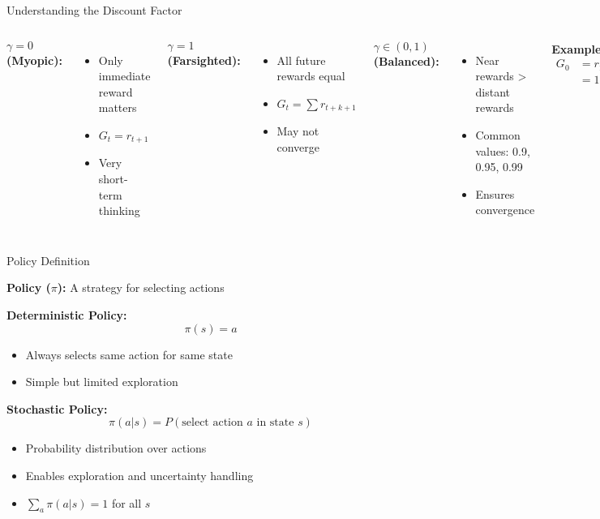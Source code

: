 \documentclass[aspectratio=169,10pt]{beamer}
\begin{document}
\begin{frame}{Understanding the Discount Factor}

\begin{columns}[t]
\textbf{$\gamma = 0$ (Myopic):}
\begin{itemize}
    \item Only immediate reward matters
    \item $G_t = r_{t+1}$
    \item Very short-term thinking
\end{itemize}

\vfill

\textbf{$\gamma = 1$ (Farsighted):}
\begin{itemize}
    \item All future rewards equal
    \item $G_t = \sum r_{t+k+1}$
    \item May not converge
\end{itemize}

\textbf{$\gamma \in (0,1)$ (Balanced):}
\begin{itemize}
    \item Near rewards > distant rewards
    \item Common values: 0.9, 0.95, 0.99
    \item Ensures convergence
\end{itemize}

\vfill

\textbf{Example ($\gamma = 0.9$):}
\begin{align}
G_0 &= r_1 + 0.9 r_2 + 0.81 r_3 + \ldots\\
&= 1 + 0.9 + 0.81 + 0.729 + \ldots
\end{align}
\end{columns}

\end{frame}

\begin{frame}{Policy Definition}

\textbf{Policy ($\pi$):} A strategy for selecting actions

\vfill

\textbf{Deterministic Policy:}
$$\pi(s) = a$$
\begin{itemize}
    \item Always selects same action for same state
    \item Simple but limited exploration
\end{itemize}

\vfill

\textbf{Stochastic Policy:}
$$\pi(a|s) = P(\text{select action } a \text{ in state } s)$$
\begin{itemize}
    \item Probability distribution over actions
    \item Enables exploration and uncertainty handling
    \item $\sum_a \pi(a|s) = 1$ for all $s$
\end{itemize}

\end{frame}
\end{document}
